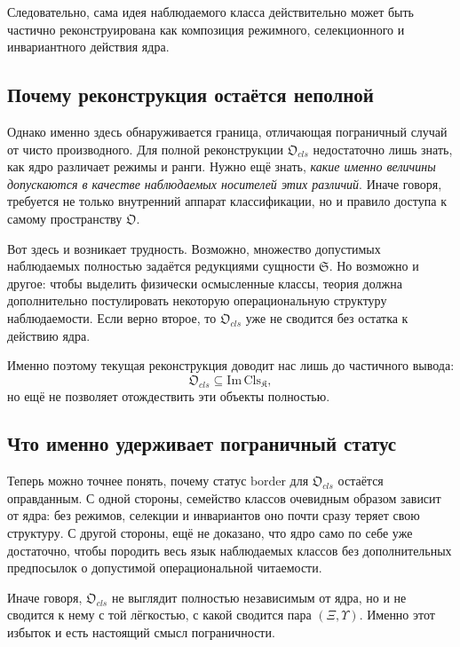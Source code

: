 \documentclass[12pt,a4paper]{article}
\begin{document}
Следовательно, сама идея наблюдаемого класса действительно может быть частично реконструирована как композиция режимного, селекционного и инвариантного действия ядра.

\subsection{Почему реконструкция остаётся неполной}

Однако именно здесь обнаруживается граница, отличающая пограничный случай от чисто производного. Для полной реконструкции \(\mathfrak{O}_{cls}\) недостаточно лишь знать, как ядро различает режимы и ранги. Нужно ещё знать, \textit{какие именно величины допускаются в качестве наблюдаемых носителей этих различий}. Иначе говоря, требуется не только внутренний аппарат классификации, но и правило доступа к самому пространству \(\mathfrak{O}\).

Вот здесь и возникает трудность. Возможно, множество допустимых наблюдаемых полностью задаётся редукциями сущности \(\mathfrak{S}\). Но возможно и другое: чтобы выделить физически осмысленные классы, теория должна дополнительно постулировать некоторую операциональную структуру наблюдаемости. Если верно второе, то \(\mathfrak{O}_{cls}\) уже не сводится без остатка к действию ядра.

Именно поэтому текущая реконструкция доводит нас лишь до частичного вывода:
\begin{equation}
\mathfrak{O}_{cls}\subseteq \mathrm{Im}\,\mathrm{Cls}_{\mathfrak{K}},
\end{equation}
но ещё не позволяет отождествить эти объекты полностью.

\subsection{Что именно удерживает пограничный статус}

Теперь можно точнее понять, почему статус \(\mathrm{border}\) для \(\mathfrak{O}_{cls}\) остаётся оправданным. С одной стороны, семейство классов очевидным образом зависит от ядра: без режимов, селекции и инвариантов оно почти сразу теряет свою структуру. С другой стороны, ещё не доказано, что ядро само по себе уже достаточно, чтобы породить весь язык наблюдаемых классов без дополнительных предпосылок о допустимой операциональной читаемости.

Иначе говоря, \(\mathfrak{O}_{cls}\) не выглядит полностью независимым от ядра, но и не сводится к нему с той лёгкостью, с какой сводится пара \((\Xi,\Upsilon)\). Именно этот избыток и есть настоящий смысл пограничности.
\end{document}
